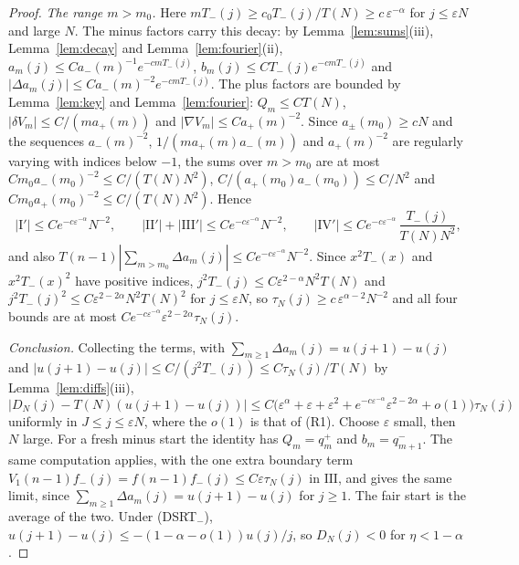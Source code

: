 \begin{proof}
\emph{The range $m>m_0$.} Here $mT_\minus(j)\ge c_0T_\minus(j)/T(N)\ge c\,\varepsilon^{-\alpha}$ for
$j\le\varepsilon N$ and large $N$. The minus factors carry this decay: by Lemma~\ref{lem:sums}(iii),
Lemma~\ref{lem:decay} and Lemma~\ref{lem:fourier}(ii), $a_m(j)\le Ca_\minus(m)^{-1}e^{-cmT_\minus(j)}$,
$b_m(j)\le CT_\minus(j)e^{-cmT_\minus(j)}$ and $|\Delta a_m(j)|\le Ca_\minus(m)^{-2}e^{-cmT_\minus(j)}$. The
plus factors are bounded by Lemma~\ref{lem:key} and Lemma~\ref{lem:fourier}: $Q_m\le CT(N)$,
$|\delta V_m|\le C/(ma_\plus(m))$ and $|\nabla V_m|\le Ca_\plus(m)^{-2}$. Since $a_\pm(m_0)\ge cN$ and the
sequences $a_\minus(m)^{-2}$, $1/(ma_\plus(m)a_\minus(m))$ and $a_\plus(m)^{-2}$ are regularly varying
with indices below $-1$, the sums over $m>m_0$ are at most $Cm_0a_\minus(m_0)^{-2}\le C/(T(N)N^2)$,
$C/(a_\plus(m_0)a_\minus(m_0))\le C/N^2$ and $Cm_0a_\plus(m_0)^{-2}\le C/(T(N)N^2)$. Hence
\[
 |\mathrm I'|\le Ce^{-c\varepsilon^{-\alpha}}N^{-2},\qquad
 |\mathrm{II}'|+|\mathrm{III}'|\le Ce^{-c\varepsilon^{-\alpha}}N^{-2},\qquad
 |\mathrm{IV}'|\le Ce^{-c\varepsilon^{-\alpha}}\,\frac{T_\minus(j)}{T(N)N^2},
\]
and also $T(n-1)|\sum_{m>m_0}\Delta a_m(j)|\le Ce^{-c\varepsilon^{-\alpha}}N^{-2}$. Since $x^2T_\minus(x)$ and
$x^2T_\minus(x)^2$ have positive indices, $j^2T_\minus(j)\le C\varepsilon^{2-\alpha}N^2T(N)$ and
$j^2T_\minus(j)^2\le C\varepsilon^{2-2\alpha}N^2T(N)^2$ for $j\le\varepsilon N$, so
$\tau_N(j)\ge c\,\varepsilon^{\alpha-2}N^{-2}$ and all four bounds are at most
$Ce^{-c\varepsilon^{-\alpha}}\varepsilon^{2-2\alpha}\tau_N(j)$.

\emph{Conclusion.} Collecting the terms, with $\sum_{m\ge1}\Delta a_m(j)=u(j+1)-u(j)$ and
$|u(j+1)-u(j)|\le C/(j^2T_\minus(j))\le C\tau_N(j)/T(N)$ by Lemma~\ref{lem:diffs}(iii),
\[
 |D_N(j)-T(N)(u(j+1)-u(j))|\le C\bigl(\varepsilon^\alpha+\varepsilon+\varepsilon^2+e^{-c\varepsilon^{-\alpha}}\varepsilon^{2-2\alpha}+o(1)\bigr)\tau_N(j)
\]
uniformly in $J\le j\le\varepsilon N$, where the $o(1)$ is that of (R1). Choose $\varepsilon$ small,
then $N$ large. For a fresh minus start the identity has $Q_m=q^\plus_m$ and $b_m=q^\minus_{m+1}$. The
same computation applies, with the one extra boundary term $V_1(n-1)f_\minus(j)=f(n-1)f_\minus(j)\le C\varepsilon\tau_N(j)$
in $\mathrm{III}$, and gives the same limit, since $\sum_{m\ge1}\Delta a_m(j)=u(j+1)-u(j)$ for $j\ge1$. The
fair start is the average of the two. Under (DSRT$_\minus$), $u(j+1)-u(j)\le-(1-\alpha-o(1))u(j)/j$, so
$D_N(j)<0$ for $\eta<1-\alpha$.
\end{proof}

